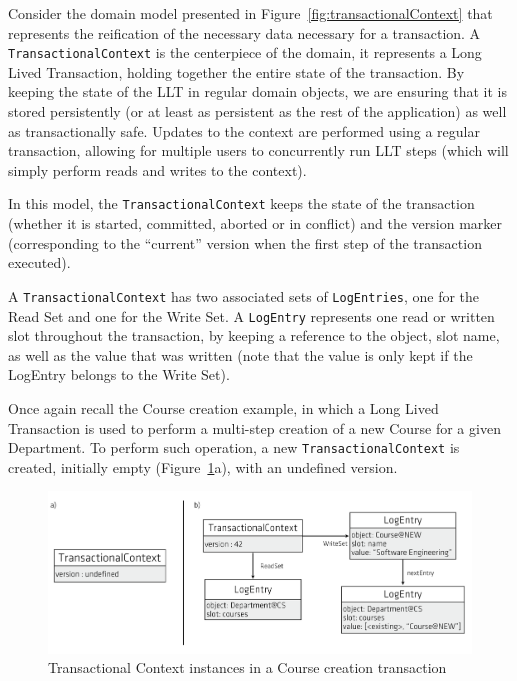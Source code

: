 Consider the domain model presented in
Figure~\ref{fig:transactionalContext} that represents the reification
of the necessary data necessary for a transaction. A
\texttt{TransactionalContext} is the centerpiece of the domain, it
represents a Long Lived Transaction, holding together the entire state
of the transaction. By keeping the state of the LLT in regular domain
objects, we are ensuring that it is stored persistently (or at least
as persistent as the rest of the application) as well as
transactionally safe. Updates to the context are performed using a
regular transaction, allowing for multiple users to concurrently run
LLT steps (which will simply perform reads and writes to the context).

In this model, the \texttt{TransactionalContext} keeps the state of
the transaction (whether it is started, committed, aborted or in
conflict) and the version marker (corresponding to the ``current''
version when the first step of the transaction executed).

A \texttt{TransactionalContext} has two associated sets of
\texttt{LogEntries}, one for the Read Set and one for the Write Set. A
\texttt{LogEntry} represents one read or written slot throughout the
transaction, by keeping a reference to the object, slot name, as well
as the value that was written (note that the value is only kept if the
LogEntry belongs to the Write Set).

Once again recall the Course creation example, in which a Long Lived
Transaction is used to perform a multi-step creation of a new Course
for a given Department. To perform such operation, a new
\texttt{TransactionalContext} is created, initially empty
(Figure~\ref{fig:course-logEntries}a), with an undefined version.

\begin{figure}
\centering
\includegraphics[width=1\linewidth]{log-entries}
\caption{Transactional Context instances in a Course creation transaction}
\label{fig:course-logEntries}
\end{figure}

